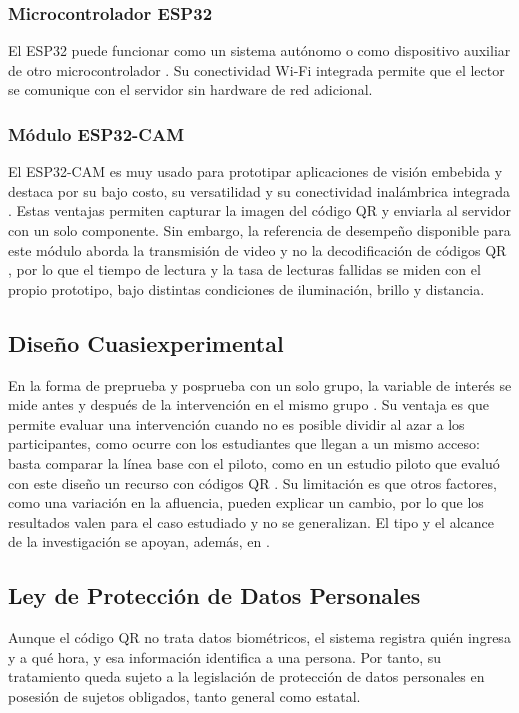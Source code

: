 \subsubsection{Microcontrolador ESP32}
El ESP32 puede funcionar como un sistema autónomo o como dispositivo auxiliar
de otro microcontrolador \parencite{espressif2025esp32}. Su conectividad Wi-Fi
integrada permite que el lector se comunique con el servidor sin hardware de
red adicional.

\subsubsection{Módulo ESP32-CAM}
El ESP32-CAM es muy usado para prototipar aplicaciones de visión embebida y
destaca por su bajo costo, su versatilidad y su conectividad inalámbrica
integrada \parencite{nowroz2025esp32cam}. Estas ventajas permiten capturar la
imagen del código QR y enviarla al servidor con un solo componente. Sin
embargo, la referencia de desempeño disponible para este módulo aborda la
transmisión de video y no la decodificación de códigos QR
\parencite{nowroz2025esp32cam}, por lo que el tiempo de lectura y la tasa de
lecturas fallidas se miden con el propio prototipo, bajo distintas
condiciones de iluminación, brillo y distancia.

\subsection{Diseño Cuasiexperimental}
En la forma de preprueba y posprueba con un solo grupo, la variable de interés
se mide antes y después de la intervención en el mismo grupo
\parencite{cranmer2017pretestposttest}. Su ventaja es que permite evaluar una
intervención cuando no es posible dividir al azar a los participantes, como
ocurre con los estudiantes que llegan a un mismo acceso: basta comparar la
línea base con el piloto, como en un estudio piloto que evaluó con este diseño
un recurso con códigos QR \parencite{ortiz2026qrpilot}. Su limitación es que otros factores, como una variación en la afluencia, pueden
explicar un cambio, por lo que los resultados valen para el caso estudiado y
no se generalizan. El tipo y el alcance de la investigación se apoyan, además,
en \textcite{hernandezsampieri2014metodologia}.

\subsection{Ley de Protección de Datos Personales}
Aunque el código QR no trata datos biométricos, el sistema registra quién
ingresa y a qué hora, y esa información identifica a una persona. Por tanto,
su tratamiento queda sujeto a la legislación de protección de datos personales
en posesión de sujetos obligados, tanto general como estatal.

